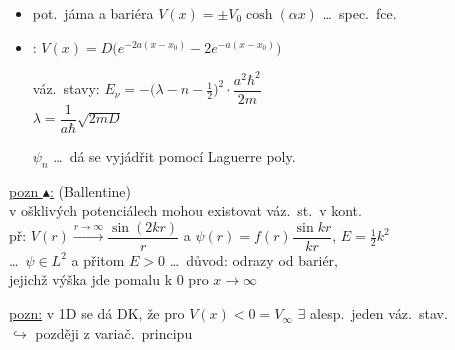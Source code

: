 \begin{itemize}
  \item pot.\ jáma a bariéra \quad $V(x) = \pm V_0\cosh(\alpha x)$ \quad \dots\ spec.\ fce.
  \item {}: \quad $V(x) = D\big(e^{-2a(x-x_0)} - 2e^{-a(x-x_0)}\big)$

  \begin{minipage}{0.6\textwidth}
  váz.\ stavy: \quad $E_\nu = -\big(\lambda - n - \tfrac12\big)^2\cdot\dfrac{a^2\hbar^2}{2m}$ \\[4pt]
  \hspace*{2.2cm} $\lambda = \dfrac{1}{a\hbar}\sqrt{2mD}$

  \medskip
  $\psi_n$ \dots\ dá se vyjádřit pomocí Laguerre poly.
  \end{minipage}
  \begin{minipage}{0.35\textwidth}
  \end{minipage}
\end{itemize}

\underline{pozn $\blacktriangle$:} (Ballentine) \\
v ošklivých potenciálech mohou existovat váz.\ st.\ v kont. \\
\quad př: \quad $V(r)\xrightarrow{r\to\infty}\dfrac{\sin(2kr)}{r}$ \quad a \quad
$\psi(r) = f(r)\dfrac{\sin kr}{kr}$, \quad $E = \frac12k^2$ \\
\quad \dots\ $\psi\in L^2$ a přitom $E > 0$ \quad \dots\ důvod: odrazy od bariér, \\
\hspace*{5cm} jejichž výška jde pomalu k $0$ pro $x\to\infty$

\underline{pozn:} v 1D se dá DK, že pro $V(x) < 0 = V_\infty$ $\exists$ alesp.\ jeden váz.\ stav. \\
\hspace*{3.5cm} $\hookrightarrow$ později z variač.\ principu

